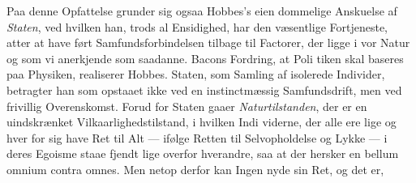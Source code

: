 \documentclass[12pt,a4paper]{book}
\begin{document}
Paa denne Opfattelse grunder sig ogsaa Hobbes's eien\-%
dommelige Anskuelse af \emph{Staten}, ved hvilken han, trods al
Ensidighed, har den væsentlige Fortjeneste, atter at have ført
Samfundsforbindelsen tilbage til Factorer, der ligge i vor Natur
og som vi anerkjende som saadanne. Bacons Fordring, at Poli\-%
tiken skal baseres paa Physiken, realiserer Hobbes. Staten,
som Samling af isolerede Individer, betragter han som opstaaet
ikke ved en instinctmæssig Samfundsdrift, men ved frivillig
Overenskomst. Forud for Staten gaaer \emph{Naturtilstanden},
der er en uindskrænket Vilkaarlighedstilstand, i hvilken Indi\-%
viderne, der alle ere lige og hver for sig have Ret til Alt --- ifølge
Retten til Selvopholdelse og Lykke --- i deres Egoisme staae fjendt\-%
lige overfor hverandre, saa at der hersker en bellum omnium contra
omnes. Men netop derfor kan Ingen nyde sin Ret, og det er,
\end{document}
